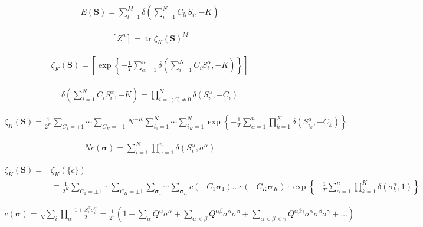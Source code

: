 \documentclass{article}
\begin{document}
\begin{align*}
E(\mathbf{S}) = \sum_{l=1}^{M} \delta \left( \sum_{i=1}^{N} C_{l i} S_i, -K \right) \tag{9.39}
\end{align*}

\begin{align*}
\left[ Z^n \right] = \operatorname{tr} \zeta_K(\mathbf{S})^M \tag{9.40}
\end{align*}

\begin{align*}
\zeta_K(\mathbf{S}) = \left[ \exp \left\{ -\frac{1}{T} \sum_{\alpha=1}^{n} \delta \left( \sum_{i=1}^{N} C_i S_i^{\alpha}, -K \right) \right\} \right] \tag{9.41}
\end{align*}

\begin{align*}
\delta \left( \sum_{i=1}^{N} C_i S_i^{\alpha}, -K \right) = \prod_{i=1; C_i \neq 0}^{N} \delta \left( S_i^{\alpha}, -C_i \right) \tag{9.42}
\end{align*}

\begin{align*}
\zeta_K(\mathbf{S}) = \frac{1}{2^K} \sum_{C_1 = \pm 1} \cdots \sum_{C_K = \pm 1} N^{-K} \sum_{i_1 = 1}^{N} \cdots \sum_{i_K = 1}^{N} \exp \left\{ -\frac{1}{T} \sum_{\alpha = 1}^{n} \prod_{k = 1}^{K} \delta(S_{i_k}^{\alpha}, -C_k) \right\}
\tag{9.43}
\end{align*}


\begin{align*}
N c(\boldsymbol{\sigma})=\sum_{i=1}^{N} \prod_{\alpha=1}^{n} \delta\left(S_{i}^{\alpha}, \sigma^{\alpha}\right) \tag{9.44}
\end{align*}

\begin{align*}
\zeta_{K}(\mathbf{S})= & \zeta_{K}(\{c\}) \\
& \equiv \frac{1}{2^{K}} \sum_{C_{1}= \pm 1} \cdots \sum_{C_{K}= \pm 1} \sum_{\boldsymbol{\sigma}_{1}} \cdots \sum_{\boldsymbol{\sigma}_{K}} c\left(-C_{1} \boldsymbol{\sigma}_{1}\right) \ldots c\left(-C_{K} \boldsymbol{\sigma}_{K}\right) \cdot \exp \left\{-\frac{1}{T} \sum_{\alpha=1}^{n} \prod_{k=1}^{K} \delta\left(\sigma_{k}^{\alpha}, 1\right)\right\}
\tag{9.45}
\end{align*}

\begin{align*}
c(\boldsymbol{\sigma})= \frac{1}{N} \sum_{i} \prod_{\alpha} \frac{1+S_{i}^{\alpha} \sigma_{i}^{\alpha}}{2} =\frac{1}{2^{n}}\left(1+\sum_{\alpha} Q^{\alpha} \sigma^{\alpha} + \sum_{\alpha<\beta} Q^{\alpha \beta} \sigma^{\alpha} \sigma^{\beta}+\sum_{\alpha<\beta<\gamma} Q^{\alpha \beta \gamma} \sigma^{\alpha} \sigma^{\beta} \sigma^{\gamma}+\ldots\right)
\tag{9.46}
\end{align*}
\end{document}
